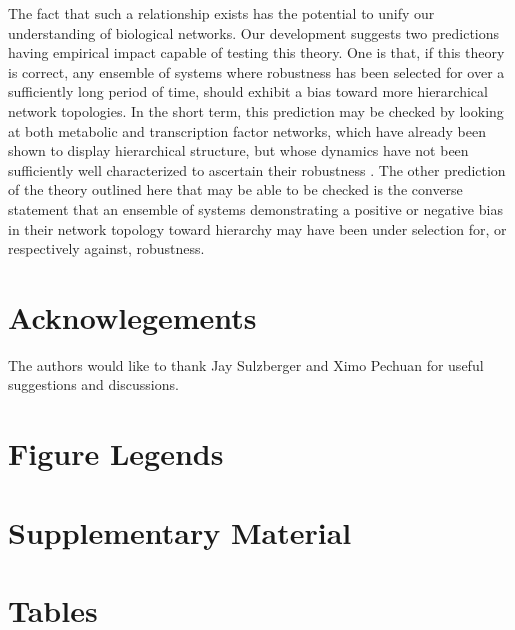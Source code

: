 The fact that such a relationship exists has the potential to unify our understanding of biological networks. Our development suggests two predictions having empirical impact capable of testing this theory. One is that, if this theory is correct, any ensemble of systems where robustness has been selected for over a sufficiently long period of time, should exhibit a bias toward more hierarchical network topologies. In the short term, this prediction may be checked by looking at both metabolic and transcription factor networks, which have already been shown to display hierarchical structure, but whose dynamics have not been sufficiently well characterized to ascertain their robustness \cite{Zhao2006,Bhardwaj2010,Colm}. The other prediction of the theory outlined here that may be able to be checked is the converse statement that an ensemble of systems demonstrating a positive or negative bias in their network topology toward hierarchy may have been under selection for, or respectively against, robustness.



\section{Acknowlegements}  The authors would like to thank Jay Sulzberger and Ximo Pechuan for useful suggestions and discussions.

\pagebreak




\pagebreak
\FloatBarrier

\section{Figure Legends}


\pagebreak
\FloatBarrier

\beginsupplement
\setcounter{secnumdepth}{4}
\section{Supplementary Material}

\section{Tables}
% 




% 

% 

% 



